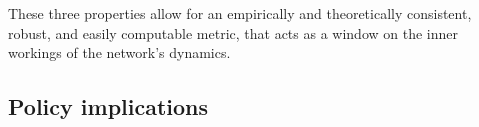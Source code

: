 \documentclass[american]{scrartcl}
\begin{document}
These three properties allow for an empirically and theoretically consistent, robust, and easily computable metric, that acts as a window on the inner workings of the network's dynamics. %


\subsection{Policy implications}



\newpage

\printbibliography
\end{document}
